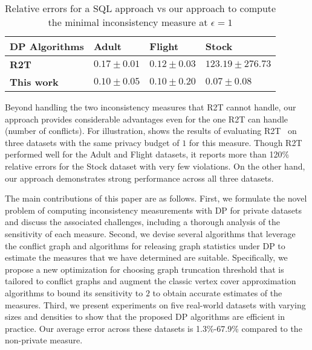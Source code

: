 \begin{table}
\centering
\begin{tabular}{|l|l|l|l|}
\hline
\textbf{DP Algorithms} & \textbf{Adult~\cite{misc_adult_2}}                  & \textbf{Flight~\cite{flight}}                 & \textbf{Stock~\cite{oleh_onyshchak_2020}}                  \\ \hline
\textbf{R2T~\cite{dong2022r2t}}           & $0.17\pm 0.01$ & $0.12\pm0.03$ & $123.19\pm 276.73$    \\ \hline
\textbf{This work}  & $0.10 \pm 0.05$ & $0.10 \pm 0.20$  & $0.07\pm 0.08$ \\ \hline
\end{tabular}
  \caption{Relative errors for a SQL approach vs our approach to compute the minimal inconsistency measure at $\epsilon=1$} \label{tab:intro_comparison}
\end{table}

Beyond handling the two inconsistency measures that R2T cannot handle, our approach provides considerable advantages even for the one R2T can handle (number of conflicts). 
For illustration,  shows the results of evaluating R2T~\cite{dong2022r2t} on three datasets with the same privacy budget of $1$ for this measure. Though R2T performed well for the Adult and Flight datasets, it reports more than 120\% relative errors for the Stock dataset with very few violations. 
On the other hand, our approach demonstrates strong performance across all three datasets.


The main contributions of this paper are as follows.
First, we formulate the novel problem of computing inconsistency measurements with DP for private datasets and discuss the associated challenges, including a thorough analysis of the sensitivity of each measure.
Second, we devise several algorithms that leverage the conflict graph and algorithms for releasing graph statistics under DP to estimate the measures that we have determined are suitable. Specifically, we propose a new optimization for choosing graph truncation threshold that is tailored to conflict graphs and augment the classic vertex cover approximation algorithms to bound its sensitivity to $2$ to obtain accurate estimates of the measures. 
Third, we present experiments on five real-world datasets with varying sizes and densities to show that the proposed DP algorithms are efficient in practice. Our average error across these datasets is 1.3\%-67.9\% compared to the non-private measure.
